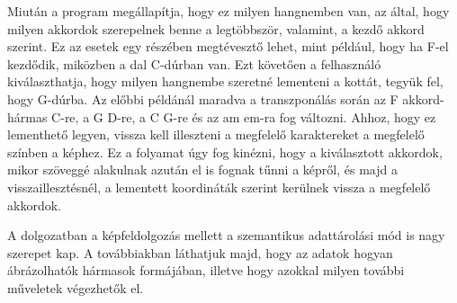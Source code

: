 Miután a program megállapítja, hogy ez milyen hangnemben van, az által, hogy milyen akkordok szerepelnek benne a legtöbbször, valamint, a kezdő akkord szerint. Ez az esetek egy részében megtévesztő lehet, mint például, hogy ha F-el kezdődik, miközben a dal C-dúrban van. Ezt követően a felhasználó kiválaszthatja, hogy milyen hangnembe szeretné lementeni a kottát, tegyük fel, hogy G-dúrba. Az előbbi példánál maradva a transzponálás során az F akkord-hármas C-re, a G D-re, a C G-re és az am em-ra fog változni. Ahhoz, hogy ez lementhető legyen, vissza kell illeszteni a megfelelő karaktereket a megfelelő színben a képhez. Ez a folyamat úgy fog kinézni, hogy a kiválasztott akkordok, mikor szöveggé alakulnak azután el is fognak tűnni a képről, és majd a visszaillesztésnél, a lementett koordináták szerint kerülnek vissza a megfelelő akkordok.

A dolgozatban a képfeldolgozás mellett a szemantikus adattárolási mód is nagy szerepet kap. A továbbiakban láthatjuk majd, hogy az adatok hogyan ábrázolhatók hármasok formájában, illetve hogy azokkal milyen további műveletek végezhetők el.
